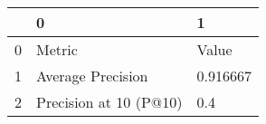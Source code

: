 \begin{tabular}{lll}
\toprule
{} &                       0 &         1 \\
\midrule
0 &                  Metric &     Value \\
1 &       Average Precision &  0.916667 \\
2 &  Precision at 10 (P@10) &       0.4 \\
\bottomrule
\end{tabular}
